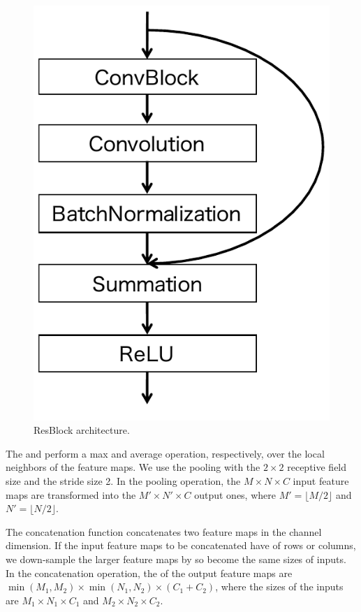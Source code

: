 \begin{figure}[t]
\begin{center}
\includegraphics[scale=0.45, bb=0 0 242 339]{images/resblock.pdf}
\caption{ResBlock architecture.}
\label{resblock}
\end{center}
\end{figure}

The  and  perform a max and average operation, respectively, over the local neighbors of the feature maps. We use the pooling with the $2 \times 2$ receptive field size and the stride size 2.
In the pooling operation, the $M \times N \times C$ input feature maps are transformed into the $M' \times N' \times C$ output ones, where $M' = \lfloor M/2 \rfloor$ and $N' = \lfloor N/2 \rfloor$.

The concatenation function concatenates two feature maps in the channel dimension.
If the input feature maps to be concatenated have   of rows or columns, we down-sample the larger feature maps by  so  become the same sizes of  inputs.
In the concatenation operation, the  of the output feature maps are $\min (M_1, M_2) \times \min (N_1, N_2) \times (C_1 + C_2)$, where  the sizes of the inputs are $M_1 \times N_1 \times C_1$ and $M_2 \times N_2 \times C_2$.

